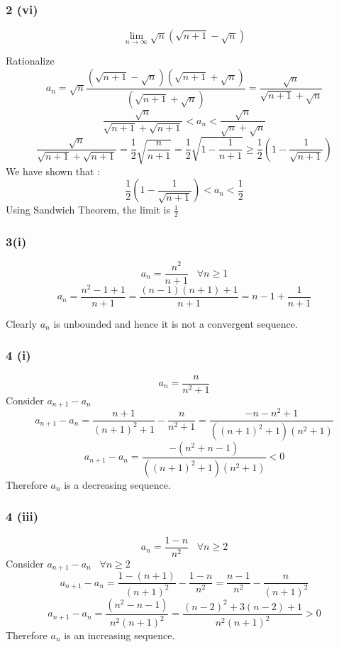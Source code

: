 \documentclass{beamer}
\begin{document}
\begin{frame}
    \frametitle{2 (vi)}
    \[\lim_{n \rightarrow \infty} \sqrt{n}(\sqrt{n+1} - \sqrt{n} )\]
    
    Rationalize \\

    \[ a_{n} = \sqrt{n}\frac{(\sqrt{n+1} - \sqrt{n} )(\sqrt{n+1} + \sqrt{n} )}{(\sqrt{n+1} + \sqrt{n} )}= \frac{\sqrt{n}}{\sqrt{n+1} + \sqrt{n}}\]\pause
    \[\frac{\sqrt{n}}{\sqrt{n+1} + \sqrt{n+1}} <  a_{n} < \frac{\sqrt{n}}{\sqrt{n} + \sqrt{n}}\] \pause
    \[\dfrac{\sqrt{n}}{\sqrt{n+1} + \sqrt{n+1}} = \dfrac{1}{2}\sqrt{\dfrac{n}{n+1}} = \dfrac{1}{2}\sqrt{1 - \dfrac{1}{n+1}} \ge \dfrac{1}{2}\left(1 - \dfrac{1}{\sqrt{n+1}}\right) \]\pause
    We have shown that :
    \[ \dfrac{1}{2}\left(1 - \dfrac{1}{\sqrt{n+1}}\right) < a_{n} < \frac{1}{2}\]
    Using Sandwich Theorem, the limit is  $\frac{1}{2}$
\end{frame}

\begin{frame}
  \frametitle{3(i)}
  \[a_{n} = \frac{n^{2}}{n+1} \; \; \; \forall n \ge 1\] \pause
  \[a_{n} = \frac{n^2-1+1}{n+1} = \frac{(n-1)(n+1)+1}{n+1} = n-1 + \frac{1}{n+1}\] \pause


  Clearly $a_{n}$ is unbounded and hence it is not a convergent sequence.
\end{frame}

\begin{frame}
    \frametitle{4 (i)}
    \[a_{n} = \frac{n}{n^{2}+1}\] \pause
    Consider \(a_{n+1}-a_{n}\)
    \[a_{n+1}-a_{n} = \frac{n+1}{(n+1)^{2}+1} - \frac{n}{n^2+1} = \frac{-n-n^{2}+1}{((n+1)^{2}+1)(n^{2}+1)} \]\pause
    \[a_{n+1}-a_{n} = \frac{-(n^{2}+n-1)}{((n+1)^2+1)(n^{2}+1)} < 0 \]\pause
    Therefore $a_{n}$ is a decreasing sequence.
\end{frame}



\begin{frame}
    \frametitle{4 (iii)}
    \[a_{n} = \frac{1-n}{n^{2}} \; \; \; \forall n \ge 2\]\pause
    Consider \(a_{n+1}-a_{n} \; \; \; \forall n \ge 2\)
    \[a_{n+1}-a_{n} = \frac{1-(n+1)}{(n+1)^{2}} - \frac{1-n}{n^2} = \frac{n-1}{n^2} - \frac{n}{(n+1)^{2}} \]\pause
    \[a_{n+1}-a_{n} = \frac{(n^{2}-n-1)}{n^{2}(n+1)^2} = \frac{(n-2)^{2}+3(n-2)+1}{n^{2}(n+1)^2} > 0  \]\pause
    Therefore $a_{n}$ is an increasing sequence.
\end{frame}
\end{document}
